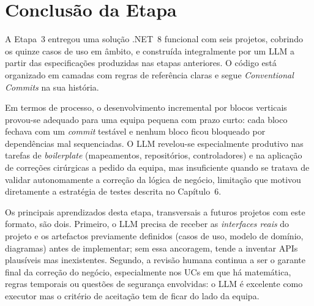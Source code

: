 \section{Conclusão da Etapa}

    A Etapa~3 entregou uma solução .NET~8 funcional com seis projetos, cobrindo os quinze casos de uso em âmbito, e construída integralmente por um LLM a partir das especificações produzidas nas etapas anteriores. O código está organizado em camadas com regras de referência claras e segue \textit{Conventional Commits} na sua história.

    Em termos de processo, o desenvolvimento incremental por blocos verticais provou-se adequado para uma equipa pequena com prazo curto: cada bloco fechava com um \textit{commit} testável e nenhum bloco ficou bloqueado por dependências mal sequenciadas. O LLM revelou-se especialmente produtivo nas tarefas de \textit{boilerplate} (mapeamentos, repositórios, controladores) e na aplicação de correções cirúrgicas a pedido da equipa, mas insuficiente quando se tratava de validar autonomamente a correção da lógica de negócio, limitação que motivou diretamente a estratégia de testes descrita no Capítulo~6.

    Os principais aprendizados desta etapa, transversais a futuros projetos com este formato, são dois. Primeiro, o LLM precisa de receber as \textit{interfaces reais} do projeto e os artefactos previamente definidos (casos de uso, modelo de domínio, diagramas) antes de implementar; sem essa ancoragem, tende a inventar APIs plausíveis mas inexistentes. Segundo, a revisão humana continua a ser o garante final da correção do negócio, especialmente nos UCs em que há matemática, regras temporais ou questões de segurança envolvidas: o LLM é excelente como executor mas o critério de aceitação tem de ficar do lado da equipa.
